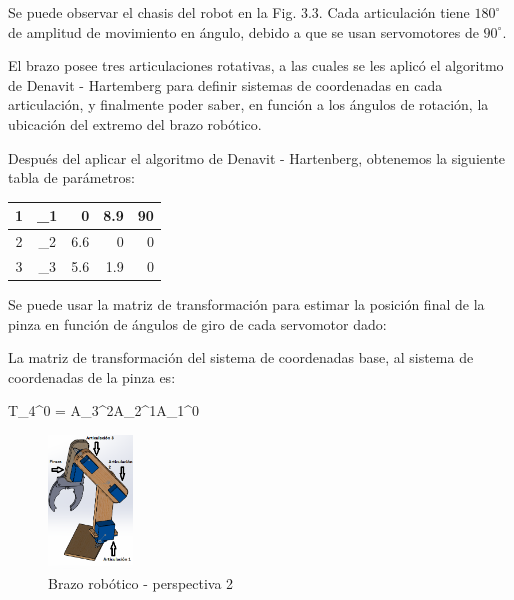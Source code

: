 \documentclass[gra_conf.tex]{subfiles}
\begin{document}
Se puede observar el chasis del robot en la Fig. 3.3. Cada articulación
tiene $180^\circ$ de amplitud de movimiento en ángulo, debido a que se 
usan servomotores de $90^\circ$.

El brazo posee tres articulaciones rotativas, a las cuales se les aplicó el algoritmo de Denavit - Hartemberg para definir sistemas de coordenadas en cada articulación, y finalmente poder saber, en función a los ángulos de rotación, la ubicación del extremo del brazo robótico.

Después del aplicar el algoritmo de Denavit - Hartenberg, obtenemos la siguiente tabla de parámetros:


\begin{tabular}[t]{|c|c|r| r| r|}
           \hline
		1 & \theta_1 & 0 & 8.9 & 90\\
	\hline
		2 & \theta_2 & 6.6 & 0 & 0\\
	\hline
		3 & \theta_3 & 5.6 & 1.9 & 0\\
	\hline
\end{tabular}


Se puede usar la matriz de transformación para estimar la posición final de la pinza en función de ángulos de giro de cada servomotor dado:


La matriz de transformación del sistema de coordenadas base, al sistema de coordenadas de la pinza es:

\centering
T_{4}^{0} = A_{3}^{2}A_{2}^{1}A_{1}^{0}


\begin{figure}[h]
\centering
  \includegraphics[width=0.2\textwidth]{../img/Brazo2.png}
  \caption{Brazo robótico - perspectiva 2}
  \label{brazo2}
\end{figure}
\end{document}
